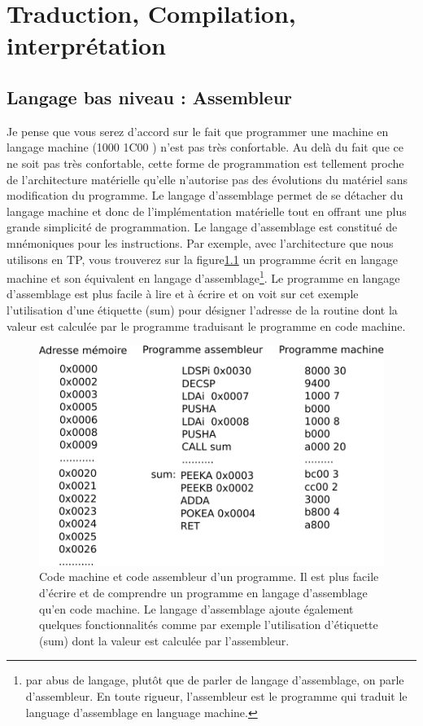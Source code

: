 \chapter{Traduction, Compilation, interprétation}

\section{Langage bas niveau : Assembleur}

Je pense que vous serez d'accord sur le fait que programmer une machine en langage machine (1000 1C00 ) n'est pas très confortable. Au delà du fait que ce ne soit pas très confortable, cette forme de programmation est tellement proche de l'architecture matérielle qu'elle n'autorise pas des évolutions du matériel sans modification du programme. Le langage d'assemblage permet de se détacher du langage machine et donc de l'implémentation matérielle tout en offrant une plus grande simplicité de programmation. Le langage d'assemblage est constitué de mnémoniques pour les instructions. Par exemple, avec l'architecture que nous utilisons en TP, vous trouverez sur la figure\ref{fig:codemachine_asm} un programme écrit en langage machine et son équivalent en langage d'assemblage\footnote{par abus de langage, plutôt que de parler de langage d'assemblage, on parle d'assembleur. En toute rigueur, l'assembleur est le programme qui traduit le language d'assemblage en language machine.}. Le programme en langage d'assemblage est plus facile à lire et à écrire et on voit sur cet exemple l'utilisation d'une étiquette (sum) pour désigner l'adresse de la routine dont la valeur est calculée par le programme traduisant le programme en code machine.

\begin{figure}[htbp]
\includegraphics[width=0.7\linewidth]{Figs/traduction_asm_machine_call.pdf}
\caption{\label{fig:codemachine_asm} Code machine et code assembleur d'un programme. Il est plus facile d'écrire et de comprendre un programme en langage d'assemblage qu'en code machine. Le langage d'assemblage ajoute également quelques fonctionnalités comme par exemple l'utilisation d'étiquette (sum) dont la valeur est calculée par l'assembleur.}
\end{figure}

